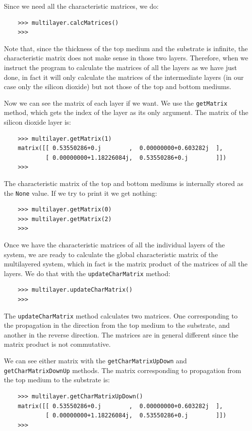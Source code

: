 \documentclass[a4paper,11pt,aps,final]{revtex4}
\begin{document}
Since we need all the characteristic matrices, we do:
\begin{verbatim}
    >>> multilayer.calcMatrices()
    >>>
\end{verbatim}

Note that, since the thickness of the top medium and the substrate is infinite, the characteristic matrix does not make sense in those two layers. Therefore, when we instruct the program to calculate the matrices of all the layers as we have just done, in fact it will only calculate the matrices of the intermediate layers (in our case only the silicon dioxide) but not those of the top and bottom mediums.

Now we can see the matrix of each layer if we want. We use the \texttt{getMatrix} method, which gets the index of the layer as its only argument. The matrix of the silicon dioxide layer is:
\begin{verbatim}
    >>> multilayer.getMatrix(1)
    matrix([[ 0.53550286+0.j        ,  0.00000000+0.603282j  ],
            [ 0.00000000+1.18226084j,  0.53550286+0.j        ]])
    >>>
\end{verbatim}

The characteristic matrix of the top and bottom mediums is internally stored as the \texttt{None} value. If we try to print it we get nothing:
\begin{verbatim}
    >>> multilayer.getMatrix(0)
    >>> multilayer.getMatrix(2)
    >>>
\end{verbatim}

Once we have the characteristic matrices of all the individual layers of the system, we are ready to calculate the global characteristic matrix of the multilayered system, which in fact is the matrix product of the matrices of all the layers. We do that with the \texttt{updateCharMatrix} method:
\begin{verbatim}
    >>> multilayer.updateCharMatrix()
    >>>
\end{verbatim}

The \texttt{updateCharMatrix} method calculates two matrices. One corresponding to the propagation in the direction from the top medium to the substrate, and another in the reverse direction. The matrices are in general different since the matrix product is not commutative.

We can see either matrix with the \texttt{getCharMatrixUpDown} and \texttt{getCharMatrixDownUp} methods. The matrix corresponding to propagation from the top medium to the substrate is:
\begin{verbatim}
    >>> multilayer.getCharMatrixUpDown()
    matrix([[ 0.53550286+0.j        ,  0.00000000+0.603282j  ],
            [ 0.00000000+1.18226084j,  0.53550286+0.j        ]])
    >>>
\end{verbatim}
\end{document}

